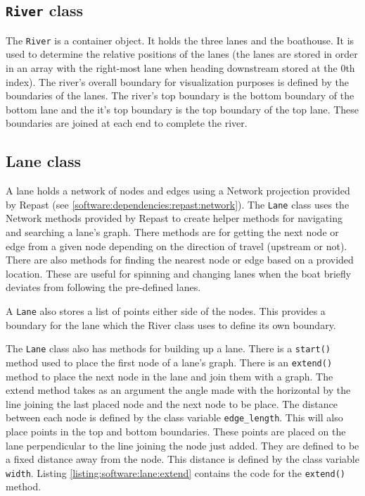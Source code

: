 \subsection{\texttt{River} class}
The \texttt{River} is a container object. It holds the three lanes and the
boathouse. It is used to determine the relative positions of the lanes
(the lanes are stored in order in an array with the right-most lane when
heading downstream stored at the 0th index). The river's overall
boundary for visualization purposes is defined by the boundaries of
the lanes. The river's top boundary is the bottom boundary of
the bottom lane and the it's top boundary is the top boundary
of the top lane. These boundaries are joined at each end to
complete the river.

\subsection{Lane class}

A lane holds a network of nodes and edges using a Network
projection provided by Repast (see
\ref{software:dependencies:repast:network}). The \texttt{Lane} class uses the
Network methods provided by Repast to create helper methods for
navigating and searching a lane's graph. There methods are for getting the
next node or edge from a given node depending on the direction of
travel (upstream or not). There are also methods for finding the
nearest node or edge based on a provided location. These are useful
for spinning and changing lanes when the boat briefly deviates from
following the pre-defined lanes.

A \texttt{Lane} also stores a list of points either side of the nodes. This
provides a boundary for the lane which the River class uses to define
its own boundary.

The \texttt{Lane} class also has methods for building up a lane. There is a
\texttt{start()} method used to place the first node of a lane's
graph. There is an \texttt{extend()} method to place the next node in
the lane and join them with a graph. The extend method takes as an argument the angle made with the horizontal
by the line joining the last placed node and the next node to be
place. The distance
between each node is defined by the class variable
\texttt{edge\_length}. This will also place points in the top and
bottom boundaries. These points are placed on the lane perpendicular
to the line joining the node just added. They are defined to be a fixed distance away from
the node. This distance is defined by the class variable
\texttt{width}. Listing \ref{listing:software:lane:extend} contains the code for the \texttt{extend()} method.

